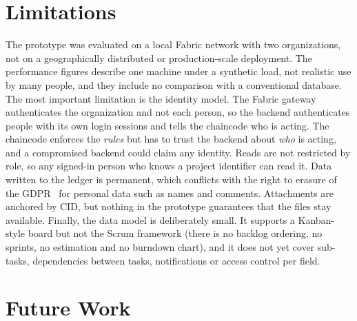 \section{Limitations}
\label{sec:limitations}

The prototype was evaluated on a local Fabric network with two organizations, not on a geographically distributed or production-scale deployment. The performance figures describe one machine under a synthetic load, not realistic use by many people, and they include no comparison with a conventional database. The most important limitation is the identity model. The Fabric gateway authenticates the organization and not each person, so the backend authenticates people with its own login sessions and tells the chaincode who is acting. The chaincode enforces the \emph{rules} but has to trust the backend about \emph{who} is acting, and a compromised backend could claim any identity. Reads are not restricted by role, so any signed-in person who knows a project identifier can read it. Data written to the ledger is permanent, which conflicts with the right to erasure of the GDPR~\cite{gdpr} for personal data such as names and comments. Attachments are anchored by CID, but nothing in the prototype guarantees that the files stay available. Finally, the data model is deliberately small. It supports a Kanban-style board but not the Scrum framework (there is no backlog ordering, no sprints, no estimation and no burndown chart), and it does not yet cover sub-tasks, dependencies between tasks, notifications or access control per field.

\section{Future Work}
\label{sec:future-work}

